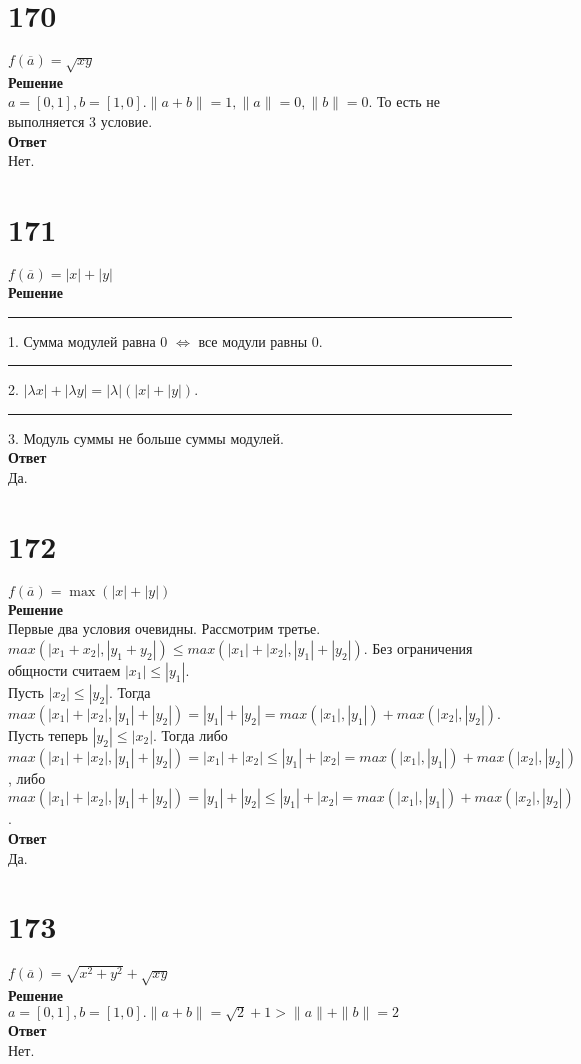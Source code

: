 \documentclass[a4paper]{article}
\begin{document}
\section*{170}
$f(\overline{a}) = \sqrt{xy}$\\
\textbf{Решение}\\
$a = [0,1], b = [1,0]. \|a + b\| = 1,\|a\|=0, \|b\|=0$. То есть не выполняется 3 условие.\\
\textbf{Ответ}\\Нет.

\section*{171}
$f(\overline{a}) = |x| + |y|$\\
\textbf{Решение}\\
\rule{5mm}{0pt}1. Сумма модулей равна 0 $\Leftrightarrow$ все модули равны 0.\\
\rule{5mm}{0pt}2. $|\lambda x|+|\lambda y| = |\lambda|(|x|+|y|).$ \\
\rule{5mm}{0pt}3. Модуль суммы не больше суммы модулей.\\
\textbf{Ответ}\\Да.

\section*{172}
$f(\overline{a}) = \max (|x| + |y|)$\\
\textbf{Решение}\\
Первые два условия очевидны. Рассмотрим третье.\\ $max(|x_1+x_2|,|y_1+y_2|) \le max(|x_1|+|x_2|,|y_1|+|y_2|).$ Без ограничения общности считаем $|x_1| \le |y_1|$. \\Пусть $|x_2| \le |y_2|$. Тогда $max(|x_1|+|x_2|,|y_1|+|y_2|) = |y_1|+|y_2| = max(|x_1|,|y_1|) + max(|x_2|,|y_2|).$ \\Пусть теперь $|y_2| \le |x_2|$. Тогда либо $max(|x_1|+|x_2|,|y_1|+|y_2|) = |x_1|+|x_2| \le |y_1|+|x_2| = max(|x_1|,|y_1|) + max(|x_2|,|y_2|)$, либо $max(|x_1|+|x_2|,|y_1|+|y_2|) = |y_1|+|y_2| \le |y_1|+|x_2| = max(|x_1|,|y_1|) + max(|x_2|,|y_2|)$.\\
\textbf{Ответ}\\Да.

\section*{173}
$f(\overline{a}) = \sqrt{x^2 + y^2} + \sqrt{xy}$\\
\textbf{Решение}\\
$a = [0,1], b = [1,0]. \|a + b\|=\sqrt{2}+1>\|a\|+\|b\|=2$\\
\textbf{Ответ}\\Нет.
\end{document}
